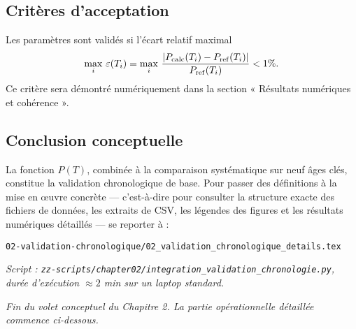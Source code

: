 \subsection{Critères d’acceptation}

Les paramètres sont validés si l’écart relatif maximal  
\[
  \max_{i}\,\varepsilon(T_{i})
  = \max_{i}\,\frac{\lvert P_{\rm calc}(T_{i}) - P_{\rm ref}(T_{i})\rvert}{P_{\rm ref}(T_{i})}
  < 1\%.
\]
Ce critère sera démontré numériquement dans la section « Résultats numériques et cohérence ».

\subsection{Conclusion conceptuelle}

La fonction \(P(T)\), combinée à la comparaison systématique sur neuf âges clés, constitue la validation chronologique de base.  
Pour passer des définitions à la mise en œuvre concrète — c’est-à-dire pour consulter la structure exacte des fichiers de données, les extraits de CSV, les légendes des figures et les résultats numériques détaillés — se reporter à :

\begin{center}
  \texttt{02-validation-chronologique/02\_validation\_chronologique\_details.tex}
\end{center}

\noindent\emph{Script : \texttt{zz-scripts/chapter02/integration\_validation\_chronologie.py}, durée d’exécution \(\approx2\) min sur un laptop standard.}

\noindent\emph{Fin du volet conceptuel du Chapitre 2. La partie opérationnelle détaillée commence ci-dessous.}
